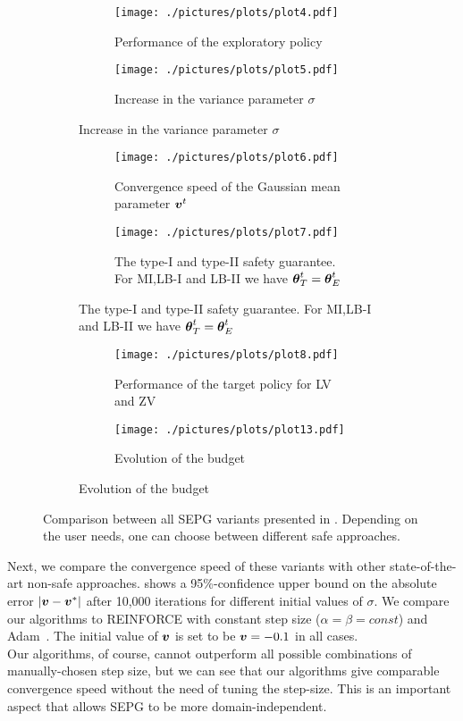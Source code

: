 \begin{figure}[t!]
\centering
\begin{subfigure}[t]{\textwidth}
\begin{subfigure}[t]{0.5\textwidth}
\texttt{[image: ./pictures/plots/plot4.pdf]}
\caption{Performance of the exploratory policy} \label{fig:plot2-1}
\end{subfigure}
\hfill
\begin{subfigure}[t]{0.5\textwidth}
\texttt{[image: ./pictures/plots/plot5.pdf]}
\caption{Increase in the variance parameter $\sigma$} \label{fig:plot2-2}
\end{subfigure}
\end{subfigure}
\begin{subfigure}[t]{\textwidth}
\begin{subfigure}[t]{0.5\textwidth}
\texttt{[image: ./pictures/plots/plot6.pdf]}
\caption{Convergence speed of the Gaussian mean parameter $\boldsymbol{v}^t$} \label{fig:plot2-3}
\end{subfigure}
\hfill
\begin{subfigure}[t]{0.5\textwidth}
\texttt{[image: ./pictures/plots/plot7.pdf]}
\caption{The type-I and type-II safety guarantee. For MI,LB-I and LB-II we have ${\boldsymbol{\theta}}^t_T = {\boldsymbol{\theta}}^t_E$} \label{fig:plot2-4}
\end{subfigure}
\end{subfigure}
\begin{subfigure}[t]{\textwidth}
\begin{subfigure}[t]{0.5\textwidth}
\texttt{[image: ./pictures/plots/plot8.pdf]}
\caption{Performance of the target policy for LV and ZV} \label{fig:plot2-5}
\end{subfigure}
\begin{subfigure}[t]{0.5\textwidth}
\texttt{[image: ./pictures/plots/plot13.pdf]}
\caption{Evolution of the budget} \label{fig:plot2-6}
\end{subfigure}
\end{subfigure}

\caption{Comparison between all SEPG variants presented in . Depending on the user needs, one can choose between different safe approaches. }
\label{fig:plot2}
\end{figure}

Next, we compare the convergence speed of these variants with other state-of-the-art non-safe approaches.
 shows a 95\%-confidence upper bound  on the absolute error $|\boldsymbol{v} - \boldsymbol{v}^*|$ after 10,000 iterations for different initial values of $\sigma$. We compare our algorithms to REINFORCE with constant step size ($\alpha = \beta = const$) and Adam~\cite{kingma2014adam}. The initial value of $\boldsymbol{v}$ is set to be $\boldsymbol{v}=-0.1$ in all cases. \\
Our algorithms, of course, cannot outperform all possible combinations of manually-chosen step size, but we can see that our algorithms give comparable convergence speed without the need of tuning the step-size. This is an important aspect that allows SEPG to be more domain-independent.

